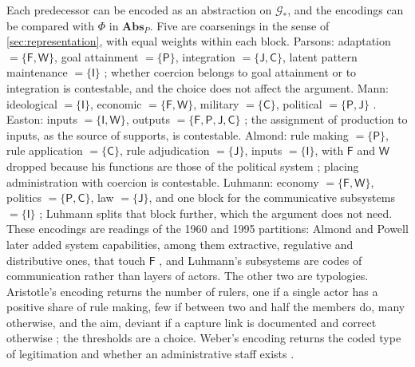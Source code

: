 \documentclass[11pt,letterpaper]{article}
\theoremstyle{definition}
\theoremstyle{remark}
\newcommand{\pF}{\mathsf{F}}
\newcommand{\pP}{\mathsf{P}}
\newcommand{\pJ}{\mathsf{J}}
\newcommand{\pI}{\mathsf{I}}
\newcommand{\pC}{\mathsf{C}}
\newcommand{\pW}{\mathsf{W}}
\begin{document}
Each predecessor can be encoded as an abstraction on $\mathcal{G}_*$, and the encodings can be compared with $\Phi$ in $\mathbf{Abs}_P$. Five are coarsenings in the sense of \cref{sec:representation}, with equal weights within each block. Parsons: adaptation $=\{\pF,\pW\}$, goal attainment $=\{\pP\}$, integration $=\{\pJ,\pC\}$, latent pattern maintenance $=\{\pI\}$ \citep{parsons1951}; whether coercion belongs to goal attainment or to integration is contestable, and the choice does not affect the argument. Mann: ideological $=\{\pI\}$, economic $=\{\pF,\pW\}$, military $=\{\pC\}$, political $=\{\pP,\pJ\}$ \citep{mann1986}. Easton: inputs $=\{\pI,\pW\}$, outputs $=\{\pF,\pP,\pJ,\pC\}$ \citep{easton1965}; the assignment of production to inputs, as the source of supports, is contestable. Almond: rule making $=\{\pP\}$, rule application $=\{\pC\}$, rule adjudication $=\{\pJ\}$, inputs $=\{\pI\}$, with $\pF$ and $\pW$ dropped because his functions are those of the political system \citep{almond1960}; placing administration with coercion is contestable. Luhmann: economy $=\{\pF,\pW\}$, politics $=\{\pP,\pC\}$, law $=\{\pJ\}$, and one block for the communicative subsystems $=\{\pI\}$ \citep{luhmann1995}; Luhmann splits that block further, which the argument does not need. These encodings are readings of the 1960 and 1995 partitions: Almond and Powell later added system capabilities, among them extractive, regulative and distributive ones, that touch $\pF$ \citep{almond1966}, and Luhmann's subsystems are codes of communication rather than layers of actors. The other two are typologies. Aristotle's encoding returns the number of rulers, one if a single actor has a positive share of rule making, few if between two and half the members do, many otherwise, and the aim, deviant if a capture link is documented and correct otherwise \citep{aristotle1996}; the thresholds are a choice. Weber's encoding returns the coded type of legitimation and whether an administrative staff exists \citep{weber1978}.
\end{document}
